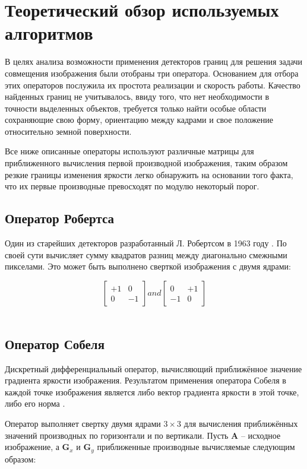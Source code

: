 \section{Теоретический обзор используемых алгоритмов}
\label{sec:realization}
В целях анализа возможности применения детекторов границ для решения задачи совмещения изображения были отобраны три оператора. Основанием для отбора этих операторов послужила их простота реализации и скорость работы. Качество найденных границ не учитывалось, ввиду того, что нет необходимости в точности выделенных объектов, требуется только найти особые области сохраняющие свою форму, ориентацию между кадрами и свое положение относительно земной поверхности.

Все ниже описанные операторы используют различные матрицы для приближенного вычисления первой производной изображения, таким образом резкие границы изменения яркости легко обнаружить на основании того факта, что их первые производные превосходят по модулю некоторый порог.
\subsection{Оператор Робертса}
Один из старейших детекторов разработанный Л. Робертсом в 1963 году \cite{RobertsPhD}. По своей сути вычисляет сумму квадратов разниц между диагонально смежными пикселами. Это может быть выполнено сверткой изображения с двумя ядрами:

\begin{equation}
\begin{bmatrix}
+1 & 0\\
0 & -1
\end{bmatrix}
and
\begin{bmatrix}
0 & +1\\
-1 & 0
\end{bmatrix}
\end{equation}
\\
\subsection{Оператор Собеля}
Дискретный дифференциальный оператор, вычисляющий приближённое значение градиента яркости изображения. Результатом применения оператора Собеля в каждой точке изображения является либо вектор градиента яркости в этой точке, либо его норма \cite{Sobel_14}. 

Оператор выполняет свертку двумя ядрами $3 \times 3$ для вычисления приближённых значений производных по горизонтали и по вертикали. Пусть $\mathbf{A}$ -- исходное изображение, а $\mathbf{G}_x$ и $\mathbf{G}_y$ приближенные производные вычисляемые следующим образом:

